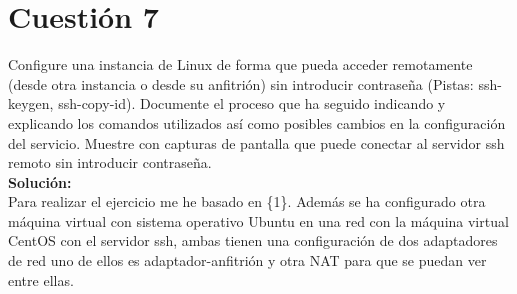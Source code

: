 \documentclass[a4paper, 11pt]{article} %
\begin{document}
\section{Cuestión 7}
Configure una instancia de Linux de forma que pueda acceder remotamente (desde otra instancia o desde su anfitrión) sin introducir contraseña (Pistas: ssh-keygen, ssh-copy-id). Documente el proceso que ha seguido indicando y explicando los comandos utilizados así como posibles cambios en la configuración del servicio. Muestre con capturas de pantalla que puede conectar al servidor ssh remoto sin introducir contraseña.\\
\textbf{Solución:}\\
Para realizar el ejercicio me he basado en \{1\}. Además se ha configurado otra máquina virtual con sistema operativo Ubuntu en una red con la máquina virtual CentOS con el servidor ssh, ambas tienen una configuración de dos adaptadores de red uno de ellos es adaptador-anfitrión y otra NAT para que se puedan ver entre ellas.\\
\end{document}
